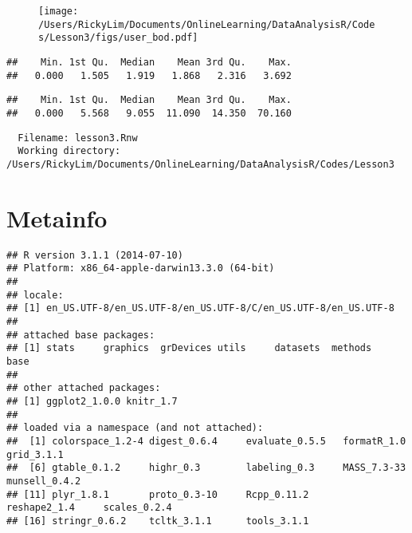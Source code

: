 \documentclass{article}
\begin{document}
\begin{figure}
    \texttt{[image: /Users/RickyLim/Documents/OnlineLearning/DataAnalysisR/Codes/Lesson3/figs/user\_bod.pdf]}
\end{figure}

\begin{knitrout}
\color{fgcolor}\begin{kframe}
\begin{alltt}
\hlstd{(}\hlopt{$} \hlopt{+} \hlstd{))} 
\end{alltt}
\begin{verbatim}
##    Min. 1st Qu.  Median    Mean 3rd Qu.    Max. 
##   0.000   1.505   1.919   1.868   2.316   3.692
\end{verbatim}
\begin{alltt}
\hlstd{(}\hlopt{$}
\end{alltt}
\begin{verbatim}
##    Min. 1st Qu.  Median    Mean 3rd Qu.    Max. 
##   0.000   5.568   9.055  11.090  14.350  70.160
\end{verbatim}
\end{kframe}
\end{knitrout}

\begin{verbatim}
  Filename: lesson3.Rnw 
  Working directory: /Users/RickyLim/Documents/OnlineLearning/DataAnalysisR/Codes/Lesson3 
\end{verbatim}

\section{Metainfo}
\begin{knitrout}
\color{fgcolor}\begin{kframe}
\begin{alltt}
\hlstd{()}
\end{alltt}
\begin{verbatim}
## R version 3.1.1 (2014-07-10)
## Platform: x86_64-apple-darwin13.3.0 (64-bit)
## 
## locale:
## [1] en_US.UTF-8/en_US.UTF-8/en_US.UTF-8/C/en_US.UTF-8/en_US.UTF-8
## 
## attached base packages:
## [1] stats     graphics  grDevices utils     datasets  methods   base     
## 
## other attached packages:
## [1] ggplot2_1.0.0 knitr_1.7    
## 
## loaded via a namespace (and not attached):
##  [1] colorspace_1.2-4 digest_0.6.4     evaluate_0.5.5   formatR_1.0      grid_3.1.1      
##  [6] gtable_0.1.2     highr_0.3        labeling_0.3     MASS_7.3-33      munsell_0.4.2   
## [11] plyr_1.8.1       proto_0.3-10     Rcpp_0.11.2      reshape2_1.4     scales_0.2.4    
## [16] stringr_0.6.2    tcltk_3.1.1      tools_3.1.1
\end{verbatim}
\end{kframe}
\end{knitrout}
\end{document}
